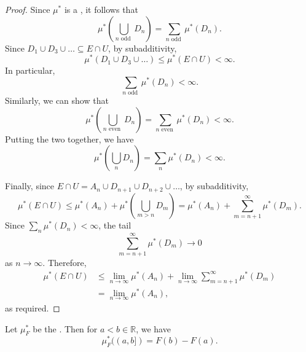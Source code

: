 \documentclass[notoc,notitlepage]{tufte-book}
\begin{document}
\begin{proof}
  Since $\mu^*$ is a , it follows that
  \begin{equation*}
    \mu^* \left( \bigcup_{n \text{ odd }} D_n \right)
    = \sum_{n \text{ odd }} \mu^*(D_n).
  \end{equation*}
  Since $D_1 \cup D_3 \cup \hdots \subseteq E \cap U$,
  by subadditivity,
  \begin{equation*}
    \mu^*(D_1 \cup D_3 \cup \hdots) \leq \mu^*(E \cap U) < \infty.
  \end{equation*}
  In particular,
  \begin{equation*}
    \sum_{n \text{ odd }} \mu^*(D_n) < \infty.
  \end{equation*}
  Similarly, we can show that
  \begin{equation*}
    \mu^* \left( \bigcup_{n \text{ even }} D_n \right)
    = \sum_{n \text{ even }} \mu^*(D_n) < \infty.
  \end{equation*}
  Putting the two together, we have
  \begin{equation*}
    \mu^* \left( \bigcup_{n} D_n \right) = \sum_{n} \mu^*(D_n) < \infty.
  \end{equation*}

  Finally, since $E \cap U = A_n \cup D_{n+1} \cup D_{n+2} \cup \hdots$,
  by subadditivity,
  \begin{equation*}
    \mu^*(E \cap U) \leq \mu^*(A_n) + \mu^* \left( \bigcup_{m > n} D_m \right)
               = \mu^*(A_n) + \sum_{m = n + 1}^{\infty} \mu^*(D_m).
  \end{equation*}
  Since $\sum_{n} \mu^*(D_n) < \infty$, the tail
  \begin{equation*}
    \sum_{m = n + 1}^{\infty} \mu^*(D_m) \to 0
  \end{equation*}
  as $n \to \infty$.
  Therefore,
  \begin{align*}
    \mu^*(E \cap U)
    &\leq \lim_{n \to \infty} \mu^*(A_n)
      + \lim_{n \to \infty} \sum_{m = n + 1}^{\infty} \mu^*(D_m) \\
    &= \lim_{n \to \infty} \mu^*(A_n),
  \end{align*}
  as required.
\end{proof}

\begin{propo}\label{propo:lebesgue_stieltjes_outer_measure_on_half_open_intervals}
  Let $\mu_F^*$ be the .
  Then for $a < b \in \mathbb{R}$, we have
  \begin{equation*}
    \mu_F^*((a, b]) = F(b) - F(a).
  \end{equation*}
\end{propo}
\end{document}
